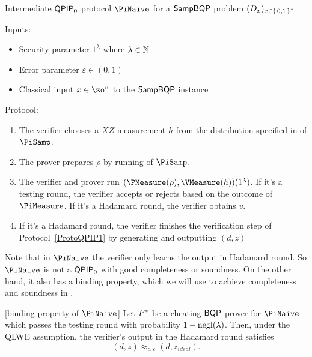 \begin{protocol}{Intermediate $\operatorname{\mathsf{QPIP}}_0$ protocol $\PiNaive$ for a $\operatorname{\mathsf{SampBQP}}$ problem $(D_x)_{x\in\set{0, 1}^*}$}
	\label{proto:qpip0_naive}

	Inputs:
	\begin{itemize}
		\item Security parameter $1^\lambda$ where $\lambda\in\mathbb{N}$
		\item Error parameter $\varepsilon\in(0, 1)$
		\item Classical input $x\in\zo^n$ to the $\operatorname{\mathsf{SampBQP}}$ instance
	\end{itemize}

	Protocol:
	\begin{enumerate}
		\item \label{step:naive1} The verifier chooses a $XZ$-measurement $h$ from the distribution specified in  of $\PiSamp$.
		\item \label{step:naive2} The prover prepares $\rho$ by running  of $\PiSamp$.
		\item \label{step:urmila-in-naive} The verifier and prover run $(\PMeasure(\rho), \VMeasure(h))(1^\lambda)$.
		If it's a testing round, the verifier accepts or rejects based on the outcome of $\PiMeasure$.
		If it's a Hadamard round, the verifier obtains $v$.
		\item \label{step:naive-output} If it's a Hadamard round, the verifier finishes the verification step of Protocol~\ref{ProtoQPIP1} by generating and outputting $(d, z)$
			
	\end{enumerate}
\end{protocol}

Note that in $\PiNaive$ the verifier only learns the output in Hadamard round.
So $\PiNaive$ is not a $\operatorname{\mathsf{QPIP}}_0$ with good completeness or soundness.
On the other hand, it also has a binding property, which we will use to achieve completeness and soundness in .

\begin{lemma}\label{lem:naive-qpip0-binding}[binding property of $\PiNaive$]
	Let $P^*$ be a cheating $\operatorname{\mathsf{BQP}}$ prover for $\PiNaive$ which passes the testing round with probability $1-\operatorname{negl}(\lambda)$.
	Then, under the QLWE assumption, the verifier's output in the Hadamard round satisfies
		$$(d, z)\approx_{c, \varepsilon}(d, z_{ideal}).$$
\end{lemma}

